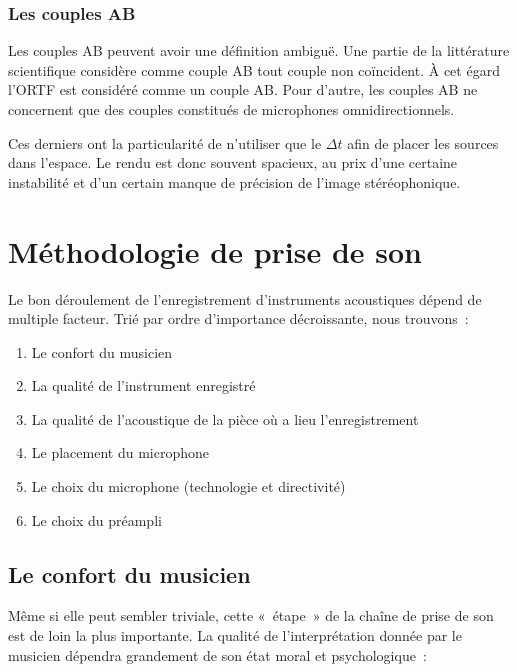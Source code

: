 \documentclass[
]{book}
\providecommand{\tightlist}{%
  \setlength{\itemsep}{0pt}\setlength{\parskip}{0pt}}
\begin{document}
\hypertarget{les-couples-ab}{%
\subsection{Les couples AB}\label{les-couples-ab}}

Les couples AB peuvent avoir une définition ambiguë. Une partie de la littérature scientifique considère comme couple AB tout couple non coïncident. À cet égard l'ORTF est considéré comme un couple AB. Pour d'autre, les couples AB ne concernent que des couples constitués de microphones omnidirectionnels.

Ces derniers ont la particularité de n'utiliser que le \(\Delta t\) afin de placer les sources dans l'espace. Le rendu est donc souvent spacieux, au prix d'une certaine instabilité et d'un certain manque de précision de l'image stéréophonique.

\hypertarget{muxe9thodologie-de-prise-de-son}{%
\chapter{Méthodologie de prise de son}\label{muxe9thodologie-de-prise-de-son}}

Le bon déroulement de l'enregistrement d'instruments acoustiques dépend de multiple facteur. Trié par ordre d'importance décroissante, nous trouvons~:

\begin{enumerate}
\def\labelenumi{\arabic{enumi}.}
\tightlist
\item
  Le confort du musicien
\item
  La qualité de l'instrument enregistré
\item
  La qualité de l'acoustique de la pièce où a lieu l'enregistrement
\item
  Le placement du microphone
\item
  Le choix du microphone (technologie et directivité)
\item
  Le choix du préampli
\end{enumerate}

\hypertarget{le-confort-du-musicien}{%
\section{Le confort du musicien}\label{le-confort-du-musicien}}

Même si elle peut sembler triviale, cette «~étape~» de la chaîne de prise de son est de loin la plus importante.
La qualité de l'interprétation donnée par le musicien dépendra grandement de son état moral et psychologique~:
\end{document}
